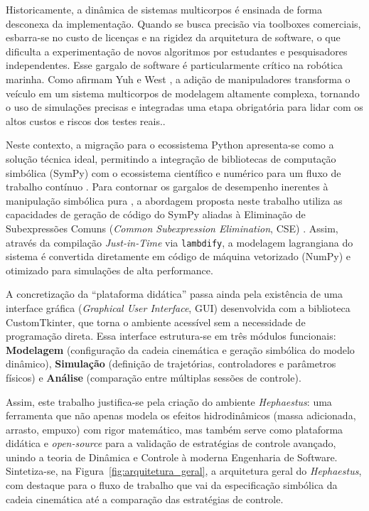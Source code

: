 Historicamente, a dinâmica de sistemas multicorpos é ensinada de forma desconexa da implementação. Quando se busca precisão via toolboxes comerciais, esbarra-se no custo de licenças e na rigidez da arquitetura de software, o que dificulta a experimentação de novos algoritmos por estudantes e pesquisadores independentes. Esse gargalo de software é particularmente crítico na robótica marinha. Como afirmam Yuh e West \cite{yuh2001underwater}, a adição de manipuladores transforma o veículo em um sistema multicorpos de modelagem altamente complexa, tornando o uso de simulações precisas e integradas uma etapa obrigatória para lidar com os altos custos e riscos dos testes reais..

Neste contexto, a migração para o ecossistema Python apresenta-se como a solução técnica ideal, permitindo a integração de bibliotecas de computação simbólica (SymPy) com o ecossistema científico e numérico para um fluxo de trabalho contínuo \cite{meurer2017sympy}. Para contornar os gargalos de desempenho inerentes à manipulação simbólica pura \cite{meurer2017sympy}, a abordagem proposta neste trabalho utiliza as capacidades de geração de código do SymPy aliadas à Eliminação de Subexpressões Comuns (\textit{Common Subexpression Elimination}, CSE) \cite{meurer2017sympy}. Assim, através da compilação \textit{Just-in-Time} via \texttt{lambdify}, a modelagem lagrangiana do sistema é convertida diretamente em código de máquina vetorizado (NumPy) e otimizado para simulações de alta performance.

A concretização da ``plataforma didática'' passa ainda pela existência de uma interface gráfica (\textit{Graphical User Interface}, GUI) desenvolvida com a biblioteca CustomTkinter, que torna o ambiente acessível sem a necessidade de programação direta. Essa interface estrutura-se em três módulos funcionais: \textbf{Modelagem} (configuração da cadeia cinemática e geração simbólica do modelo dinâmico), \textbf{Simulação} (definição de trajetórias, controladores e parâmetros físicos) e \textbf{Análise} (comparação entre múltiplas sessões de controle).

Assim, este trabalho justifica-se pela criação do ambiente \textit{Hephaestus}: uma ferramenta que não apenas modela os efeitos hidrodinâmicos (massa adicionada, arrasto, empuxo) com rigor matemático, mas também serve como plataforma didática e \textit{open-source} para a validação de estratégias de controle avançado, unindo a teoria de Dinâmica e Controle à moderna Engenharia de Software. Sintetiza-se, na Figura~\ref{fig:arquitetura_geral}, a arquitetura geral do \textit{Hephaestus}, com destaque para o fluxo de trabalho que vai da especificação simbólica da cadeia cinemática até a comparação das estratégias de controle.

